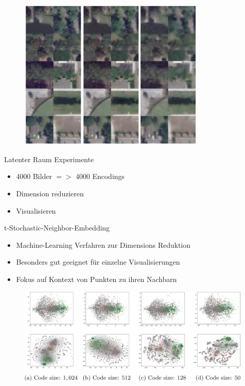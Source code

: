 \begin{frame}
	\begin{figure}
		\includegraphics[width=0.8\textwidth]{images/figures/presentation/good_reconstructions.jpg}
	\end{figure}
\end{frame}



\begin{frame}{Latenter Raum Experimente}
	\begin{itemize}
		\item 4000 Bilder $=>$ 4000 Encodings
		\item Dimension reduzieren
		\item Visualisieren
	\end{itemize}
\end{frame}




\begin{frame}{t-Stochastic-Neighbor-Embedding}
	\begin{itemize}
		\item Machine-Learning Verfahren zur Dimensions Reduktion
		\item Besonders gut geeignet für einzelne Visualisierungen
		\item Fokus auf Kontext von Punkten zu ihren Nachbarn
	\end{itemize}
\end{frame}

\begin{frame}
	\begin{figure}
		\includegraphics[width=\textwidth]{images/figures/presentation/tsne-Classes.jpg}
	\end{figure}
\end{frame}

